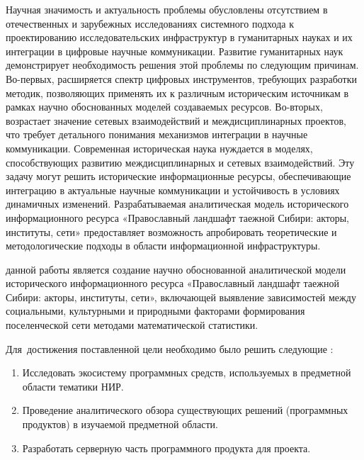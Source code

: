 
{\actuality}Научная значимость и актуальность проблемы обусловлены отсутствием в
отечественных и зарубежных исследованиях системного подхода к проектированию исследовательских инфраструктур в гуманитарных науках и их интеграции
в цифровые научные коммуникации. Развитие гуманитарных наук демонстрирует необходимость решения этой проблемы по следующим причинам. Во-первых,
расширяется спектр цифровых инструментов, требующих разработки методик,
позволяющих применять их к различным историческим источникам в рамках
научно обоснованных моделей создаваемых ресурсов. Во-вторых, возрастает значение сетевых взаимодействий и междисциплинарных проектов, что требует
детального понимания механизмов интеграции в научные коммуникации.
Современная историческая наука нуждается в моделях, способствующих
развитию междисциплинарных и сетевых взаимодействий. Эту задачу могут решить исторические информационные ресурсы, обеспечивающие интеграцию в
актуальные научные коммуникации и устойчивость в условиях динамичных изменений.
Разрабатываемая аналитическая модель исторического информационного
ресурса «Православный ландшафт таежной Сибири: акторы, институты, сети»
предоставляет возможность апробировать теоретические и методологические
подходы в области информационной инфраструктуры.


{\aim} данной работы является создание научно обоснованной аналитической модели исторического информационного ресурса «Православный ландшафт
таежной Сибири: акторы, институты, сети», включающей выявление зависимостей между социальными, культурными и природными факторами формирования
поселенческой сети методами математической статистики.

Для~достижения поставленной цели необходимо было решить следующие {\tasks}:
\begin{enumerate}[beginpenalty=10000] %
  \item Исследовать экосистему программных средств, используемых в предметной области тематики НИР.
  \item Проведение аналитического обзора существующих решений (программных продуктов) в изучаемой предметной области.
  \item Разработать серверную часть программного продукта для проекта.
\end{enumerate}


